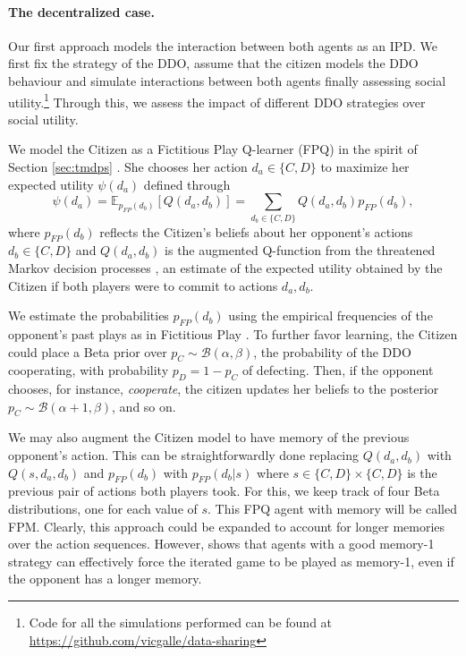 \paragraph{The decentralized case.}\label{sec:decentralized}
Our first approach models the interaction between both agents as an IPD.  We first fix the strategy of the DDO, assume that the citizen models the DDO behaviour and simulate interactions between
both agents 
finally assessing social utility.\footnote{Code for all the simulations performed can be found at \url{https://github.com/vicgalle/data-sharing}}
Through this, we assess the impact of different 
DDO strategies over social utility.

We  model the Citizen as a Fictitious Play Q-learner (FPQ) in the spirit of Section \ref{sec:tmdps} \cite{gallego2019opponent}.
She chooses her action $d_a \in \lbrace C, D \rbrace$
to maximize her expected utility $\psi(d_a)$
defined through 
\[ \psi(d_a) = \mathbb{E}_{p_{FP}(d_b)} [Q(d_a,d_b)] = \sum_{d_b \in \lbrace C, D \rbrace } Q(d_a, d_b) p_{FP}(d_b), \]
 where $p_{FP} (d_b)$ reflects the Citizen's beliefs about her opponent's
 actions $d_b \in \lbrace C, D \rbrace$
 and 
 $Q(d_a,d_b)$ is the augmented Q-function from the threatened Markov decision processes  \cite{gallego2019opponent}, 
 an estimate of the expected utility obtained by the Citizen if both
 players were to commit to actions $d_a, d_b$.
 
 We estimate the probabilities $p_{FP} (d_b)$
  using the empirical frequencies of the opponent's past
  plays as in Fictitious Play 
 \cite{brown1951iterative}. To further favor learning, the Citizen could 
place a Beta prior over $p_C \sim \mathcal{B}(\alpha, \beta)$,
the probability of the DDO cooperating, 
with probability $p_D = 1-p_C$ of defecting.
 Then, if the opponent chooses,
for instance, {\em cooperate}, the citizen updates her
beliefs to the posterior $p_C \sim \mathcal{B}(\alpha + 1, \beta)$, 
and so on. 

We may also augment the Citizen model to have memory
of the previous opponent's action. This can be
straightforwardly done replacing $Q(d_a,d_b)$ with $Q(s,d_a,d_b)$ and $p_{FP}(d_b)$ with $p_{FP}(d_b|s)$
where $s \in \lbrace C, D \rbrace \times \lbrace C, D \rbrace$ is
the previous pair of actions both players took. 
For this, we  
 keep track of four Beta distributions, one for each
value of $s$. This FPQ agent with
memory will be called FPM. 
Clearly, this approach could be expanded to account for 
longer memories over the action sequences. However,  \cite{press2012iterated} shows that agents with a 
good memory-1 strategy can effectively force the iterated 
game to be played as memory-1, even if the opponent has a
longer memory.


